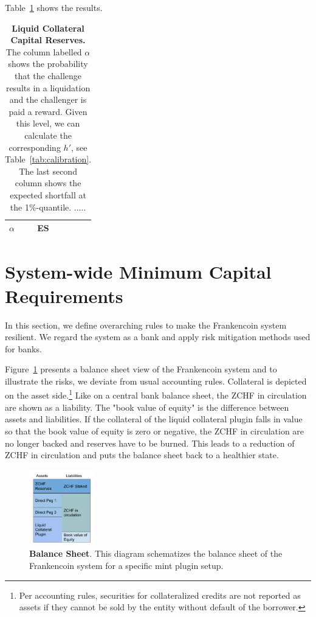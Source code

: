 \documentclass[english,11pt]{article}
\newcommand{\nothing}[1]{}
\begin{document}
Table~\ref{tab:calibration2} shows the results. \nothing{We can see that with a conservative assumption of 
challengers entering when the probability of earning the reward is $alpha=90\%$, stakers
face a $15\%$ average loss in the worst $1\%$ outcomes. We choose this number, $15\%$, as our conservative risk-based
buffer $\Theta_i^{(R)}$.}

\begin{table}[h]
\caption{\textbf{Liquid Collateral Capital Reserves.} The column labelled $\alpha$ shows the probability
that the challenge results in a liquidation and the challenger is paid a reward.
Given this level, we can calculate the corresponding $h'$, see Table~\ref{tab:calibration}.
The last second column shows the expected shortfall at the 1\%-quantile. .....
\label{tab:calibration2}}
\center
\begin{tabular}{lll}
\toprule
\textbf{$\alpha$} & \textbf{ES}   \\
\midrule
\bottomrule
\end{tabular}
\end{table}


\section{System-wide Minimum Capital Requirements}
In this section, we define overarching rules to make the Frankencoin system
resilient. We regard the system as a bank and apply risk mitigation methods
used for banks.

Figure~\ref{fig:bs} presents a balance sheet view of the Frankencoin system
and to illustrate the risks, we deviate from usual accounting rules.
Collateral is depicted on the asset side.\footnote{Per accounting rules, 
securities for collateralized credits are not reported as assets
if they cannot be sold by the entity without default of the borrower.}
Like on a central bank balance sheet, the ZCHF in circulation are shown
as a liability. The "book value of equity" is the difference between assets
and liabilities. If the collateral of the liquid collateral plugin falls in value so that
the book value of equity is zero or negative, the ZCHF in circulation
are no longer backed and reserves have to be burned. This leads
to a reduction of ZCHF in circulation and puts the balance sheet back to
a healthier state.

\begin{figure}[h]
    \center
    \includegraphics[width=0.25\textwidth]{FCBalanceSheet.pdf}
    \caption{\textbf{Balance Sheet}. This diagram
    schematizes the balance sheet of the Frankencoin system for
    a specific mint plugin setup.}\label{fig:bs}
\end{figure}
\end{document}
